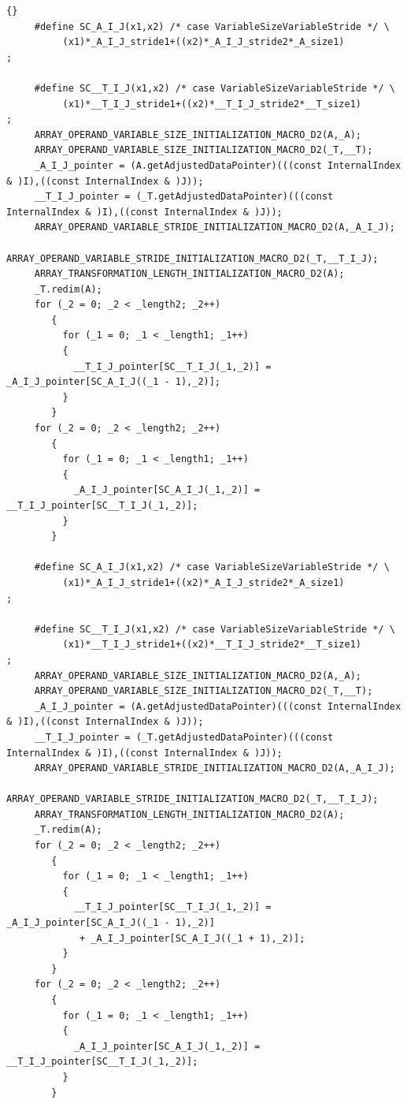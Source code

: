 \documentclass[10pt]{article}
\begin{document}
\begin{lstlisting}{}
     #define SC_A_I_J(x1,x2) /* case VariableSizeVariableStride */ \
          (x1)*_A_I_J_stride1+((x2)*_A_I_J_stride2*_A_size1)
; 
        
     #define SC__T_I_J(x1,x2) /* case VariableSizeVariableStride */ \
          (x1)*__T_I_J_stride1+((x2)*__T_I_J_stride2*__T_size1)
; 
     ARRAY_OPERAND_VARIABLE_SIZE_INITIALIZATION_MACRO_D2(A,_A); 
     ARRAY_OPERAND_VARIABLE_SIZE_INITIALIZATION_MACRO_D2(_T,__T); 
     _A_I_J_pointer = (A.getAdjustedDataPointer)(((const InternalIndex & )I),((const InternalIndex & )J)); 
     __T_I_J_pointer = (_T.getAdjustedDataPointer)(((const InternalIndex & )I),((const InternalIndex & )J)); 
     ARRAY_OPERAND_VARIABLE_STRIDE_INITIALIZATION_MACRO_D2(A,_A_I_J); 
     ARRAY_OPERAND_VARIABLE_STRIDE_INITIALIZATION_MACRO_D2(_T,__T_I_J); 
     ARRAY_TRANSFORMATION_LENGTH_INITIALIZATION_MACRO_D2(A); 
     _T.redim(A); 
     for (_2 = 0; _2 < _length2; _2++)
        { 
          for (_1 = 0; _1 < _length1; _1++)
          { 
            __T_I_J_pointer[SC__T_I_J(_1,_2)] = _A_I_J_pointer[SC_A_I_J((_1 - 1),_2)]; 
          } 
        } 
     for (_2 = 0; _2 < _length2; _2++)
        { 
          for (_1 = 0; _1 < _length1; _1++)
          { 
            _A_I_J_pointer[SC_A_I_J(_1,_2)] = __T_I_J_pointer[SC__T_I_J(_1,_2)]; 
          } 
        } 
        
     #define SC_A_I_J(x1,x2) /* case VariableSizeVariableStride */ \
          (x1)*_A_I_J_stride1+((x2)*_A_I_J_stride2*_A_size1)
; 
        
     #define SC__T_I_J(x1,x2) /* case VariableSizeVariableStride */ \
          (x1)*__T_I_J_stride1+((x2)*__T_I_J_stride2*__T_size1)
; 
     ARRAY_OPERAND_VARIABLE_SIZE_INITIALIZATION_MACRO_D2(A,_A); 
     ARRAY_OPERAND_VARIABLE_SIZE_INITIALIZATION_MACRO_D2(_T,__T); 
     _A_I_J_pointer = (A.getAdjustedDataPointer)(((const InternalIndex & )I),((const InternalIndex & )J)); 
     __T_I_J_pointer = (_T.getAdjustedDataPointer)(((const InternalIndex & )I),((const InternalIndex & )J)); 
     ARRAY_OPERAND_VARIABLE_STRIDE_INITIALIZATION_MACRO_D2(A,_A_I_J); 
     ARRAY_OPERAND_VARIABLE_STRIDE_INITIALIZATION_MACRO_D2(_T,__T_I_J); 
     ARRAY_TRANSFORMATION_LENGTH_INITIALIZATION_MACRO_D2(A); 
     _T.redim(A); 
     for (_2 = 0; _2 < _length2; _2++)
        { 
          for (_1 = 0; _1 < _length1; _1++)
          { 
            __T_I_J_pointer[SC__T_I_J(_1,_2)] = _A_I_J_pointer[SC_A_I_J((_1 - 1),_2)]
             + _A_I_J_pointer[SC_A_I_J((_1 + 1),_2)]; 
          } 
        } 
     for (_2 = 0; _2 < _length2; _2++)
        { 
          for (_1 = 0; _1 < _length1; _1++)
          { 
            _A_I_J_pointer[SC_A_I_J(_1,_2)] = __T_I_J_pointer[SC__T_I_J(_1,_2)]; 
          } 
        } 
        

\end{lstlisting}
\end{document}
